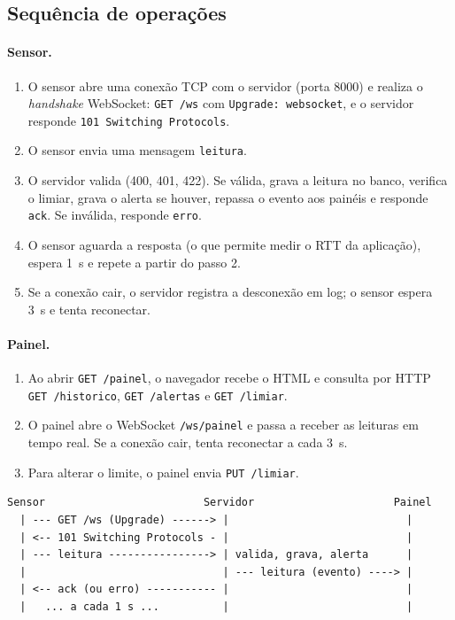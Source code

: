 \documentclass[12pt,a4paper]{article}
\begin{document}
\subsection{Sequ\^encia de opera\c{c}\~oes}

\paragraph{Sensor.}
\begin{enumerate}
  \item O sensor abre uma conex\~ao TCP com o servidor (porta 8000) e realiza o
        \emph{handshake} WebSocket: \texttt{GET /ws} com
        \texttt{Upgrade: websocket}, e o servidor responde
        \texttt{101 Switching Protocols}.
  \item O sensor envia uma mensagem \texttt{leitura}.
  \item O servidor valida (400, 401, 422). Se v\'alida, grava a leitura no banco,
        verifica o limiar, grava o alerta se houver, repassa o evento aos
        pain\'eis e responde \texttt{ack}. Se inv\'alida, responde \texttt{erro}.
  \item O sensor aguarda a resposta (o que permite medir o RTT da aplica\c{c}\~ao),
        espera 1~s e repete a partir do passo 2.
  \item Se a conex\~ao cair, o servidor registra a desconex\~ao em log; o sensor
        espera 3~s e tenta reconectar.
\end{enumerate}

\paragraph{Painel.}
\begin{enumerate}
  \item Ao abrir \texttt{GET /painel}, o navegador recebe o HTML e consulta por HTTP
        \texttt{GET /historico}, \texttt{GET /alertas} e \texttt{GET /limiar}.
  \item O painel abre o WebSocket \texttt{/ws/painel} e passa a receber as leituras
        em tempo real. Se a conex\~ao cair, tenta reconectar a cada 3~s.
  \item Para alterar o limite, o painel envia \texttt{PUT /limiar}.
\end{enumerate}

\begin{lstlisting}
Sensor                         Servidor                      Painel
  | --- GET /ws (Upgrade) ------> |                            |
  | <-- 101 Switching Protocols - |                            |
  | --- leitura ----------------> | valida, grava, alerta      |
  |                               | --- leitura (evento) ----> |
  | <-- ack (ou erro) ----------- |                            |
  |   ... a cada 1 s ...          |                            |
\end{lstlisting}
\end{document}
